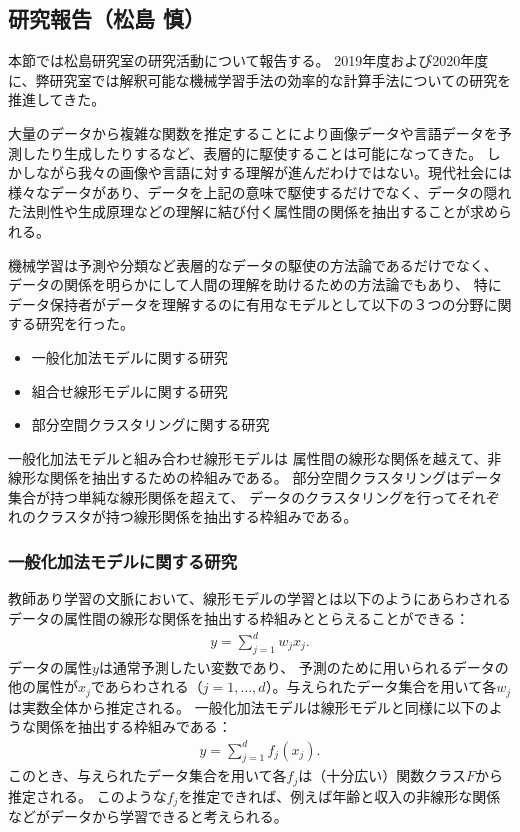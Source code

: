 \subsection{研究報告（松島 慎）}
本節では松島研究室の研究活動について報告する。
2019年度および2020年度に、弊研究室では解釈可能な機械学習手法の効率的な計算手法についての研究を推進してきた。

大量のデータから複雑な関数を推定することにより画像データや言語データを予測したり生成したりするなど、表層的に駆使することは可能になってきた。
しかしながら我々の画像や言語に対する理解が進んだわけではない。現代社会には様々なデータがあり、データを上記の意味で駆使するだけでなく、データの隠れた法則性や生成原理などの理解に結び付く属性間の関係を抽出することが求められる。

機械学習は予測や分類など表層的なデータの駆使の方法論であるだけでなく、
データの関係を明らかにして人間の理解を助けるための方法論でもあり、
特にデータ保持者がデータを理解するのに有用なモデルとして以下の３つの分野に関する研究を行った。
\begin{itemize}
    \item 一般化加法モデルに関する研究
    \item 組合せ線形モデルに関する研究
    \item 部分空間クラスタリングに関する研究
\end{itemize}

一般化加法モデルと組み合わせ線形モデルは
属性間の線形な関係を越えて、非線形な関係を抽出するための枠組みである。
部分空間クラスタリングはデータ集合が持つ単純な線形関係を超えて、
データのクラスタリングを行ってそれぞれのクラスタが持つ線形関係を抽出する枠組みである。


\subsubsection{一般化加法モデルに関する研究}
教師あり学習の文脈において、線形モデルの学習とは以下のようにあらわされるデータの属性間の線形な関係を抽出する枠組みととらえることができる：
\begin{align*}
    y = \sum_{j=1}^d w_j x_j.
\end{align*}
データの属性$y$は通常予測したい変数であり、
予測のために用いられるデータの他の属性が$x_j$であらわされる（$j=1,\ldots,d$）。与えられたデータ集合を用いて各$w_j$は実数全体から推定される。
一般化加法モデル\cite{F}は線形モデルと同様に以下のような関係を抽出する枠組みである：
\begin{align*}
    y = \sum_{j=1}^d f_j (x_j).
\end{align*}
このとき、与えられたデータ集合を用いて各$f_j$は（十分広い）関数クラス$F$から推定される。
このような$f_j$を推定できれば、例えば年齢と収入の非線形な関係などがデータから学習できると考えられる。

